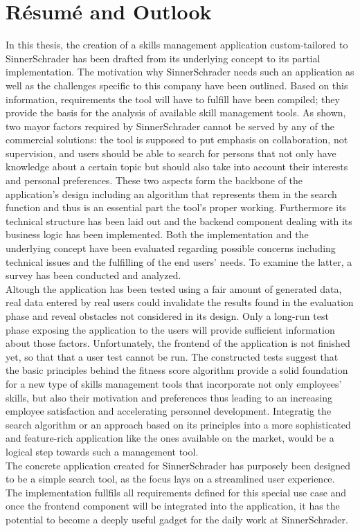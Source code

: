 \chapter{Résumé and Outlook}
In this thesis, the creation of a skills management application custom-tailored to SinnerSchrader has been drafted from its underlying concept to its partial implementation. The motivation why SinnerSchrader needs such an application as well as the challenges specific to this company have been outlined. Based on this information, requirements the tool will have to fulfill have been compiled; they provide the basis for the analysis of available skill management tools. As shown, two mayor factors required by SinnerSchrader cannot be served by any of the commercial solutions: the tool is supposed to put emphasis on collaboration, not supervision, and users should be able to search for persons that not only have knowledge about a certain topic but should also take into account their interests and personal preferences.
These two aspects form the backbone of the application's design including an algorithm that represents them in the search function and thus is an essential part the tool's proper working.
Furthermore its technical structure has been laid out and the backend component dealing with its business logic has been implemented.
Both the implementation and the underlying concept have been evaluated regarding possible concerns including technical issues and the fulfilling of the end users' needs. To examine the latter, a survey has been conducted and analyzed.\\
Altough the application has been tested using a fair amount of generated data, real data entered by real users could invalidate the
results found in the evaluation phase and reveal obstacles not considered in its design. Only a long-run test phase exposing the application to the users will provide sufficient information about those factors. Unfortunately, the frontend of the application is not finished yet, so that that a user test cannot be run.
The constructed tests suggest that the basic principles behind the fitness score algorithm provide a solid foundation for a new type of skills management tools that incorporate not only employees' skills, but also their motivation and preferences thus leading to an increasing employee satisfaction and accelerating personnel development.
Integratig the search algorithm or an approach based on its principles into a more sophisticated and feature-rich application like the ones available on the market, would be a logical step towards such a management tool. \\
The concrete application created for SinnerSchrader has purposely been designed to be a simple search tool, as the focus lays on a streamlined user experience. The implementation fullfils all requirements defined for this special use case and once the frontend component will be integrated into the application, it has the potential to become a deeply useful gadget for the daily work at SinnerSchrader.

